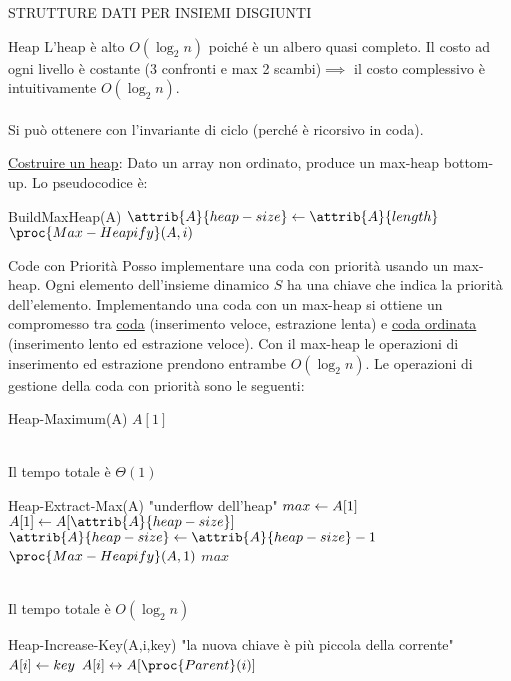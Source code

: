 \documentclass[8pt]{extarticle}
\begin{document}
\begin{formulario}
\begin{myParagraph}{STRUTTURE DATI PER INSIEMI DISGIUNTI}
\begin{subParagraph}{Heap}
L'heap è alto $O(\log_2 n)$ poiché è un albero quasi completo. Il costo ad ogni livello è costante (3 confronti e max 2 scambi)$\implies$ il costo complessivo è intuitivamente $O(\log_2 n)$. \\
\\ 
Si può ottenere con l'invariante di ciclo (perché è ricorsivo in coda).
				\begin{descr}{1}
					\item[\underline{Costruire un heap}:] Dato un array non ordinato, produce un max-heap bottom-up. Lo pseudocodice è: 
				\end{descr}
				\begin{code}{BuildMaxHeap(A)}
\li $\attrib{A}{heap-size}\get \attrib{A}{length}$
\li {}
	\li $\proc{Max-Heapify}(A,i)$
\END
				\end{code}
			\begin{subParagraph}{Code con Priorità}
Posso implementare una coda con priorità usando un max-heap. Ogni elemento dell'insieme dinamico $S$ ha una chiave che indica la priorità dell'elemento. Implementando una coda con un max-heap si ottiene un compromesso tra \underline{coda} (inserimento veloce, estrazione lenta) e \underline{coda ordinata} (inserimento lento ed estrazione veloce). Con il max-heap le operazioni di inserimento ed estrazione prendono entrambe $O(\log_2 n)$. Le operazioni di gestione della coda con priorità sono le seguenti:
				\begin{code}{Heap-Maximum(A)}
\li \RETURN $A[1]$
				\end{code}
\\
Il tempo totale è $\Theta(1)$\\
				\begin{code}{Heap-Extract-Max(A)}
\li {}
	\li \Error "underflow dell'heap"
\END
\li $max\leftarrow A[1]$
\li $A[1]\get A[\attrib{A}{heap-size}]$
\li $\attrib{A}{heap-size}\get \attrib{A}{heap-size}-1$
\li $\proc{Max-Heapify}(A,1)$
\li \RETURN $max$
				\end{code}
			\end{subParagraph}
\\
Il tempo totale è $O(\log_2 n)$\\
				\begin{code}{Heap-Increase-Key(A,i,key)}
\li {}
	\li \Error "la nuova chiave è più piccola della corrente"
\END
\li $A[i]\leftarrow key$
\li {}
	\li {} $A[i] \sse A[\proc{Parent}(i)]$

\end{code}
\end{subParagraph}
\end{myParagraph}
\end{formulario}
\end{document}
